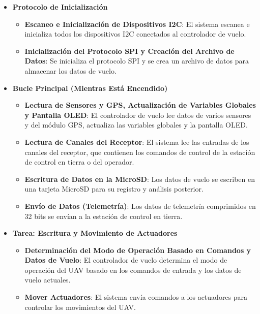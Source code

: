     \begin{itemize}
        \item \textbf{Protocolo de Inicialización}
        \begin{itemize}
            \item \textbf{Escaneo e Inicialización de Dispositivos I2C}: El sistema escanea e inicializa todos los dispositivos I2C conectados al controlador de vuelo.
            \item \textbf{Inicialización del Protocolo SPI y Creación del Archivo de Datos}: Se inicializa el protocolo SPI y se crea un archivo de datos para almacenar los datos de vuelo.
        \end{itemize}
        
        \item \textbf{Bucle Principal (Mientras Está Encendido)}
        \begin{itemize}
            \item \textbf{Lectura de Sensores y GPS, Actualización de Variables Globales y Pantalla OLED}: El controlador de vuelo lee datos de varios sensores y del módulo GPS, actualiza las variables globales y la pantalla OLED.
            \item \textbf{Lectura de Canales del Receptor}: El sistema lee las entradas de los canales del receptor, que contienen los comandos de control de la estación de control en tierra o del operador.
            \item \textbf{Escritura de Datos en la MicroSD}: Los datos de vuelo se escriben en una tarjeta MicroSD para su registro y análisis posterior.
            \item \textbf{Envío de Datos (Telemetría)}: Los datos de telemetría comprimidos en 32 bits se envían a la estación de control en tierra.
        \end{itemize}
       
        \item \textbf{Tarea: Escritura y Movimiento de Actuadores}
        \begin{itemize}
            \item \textbf{Determinación del Modo de Operación Basado en Comandos y Datos de Vuelo}: El controlador de vuelo determina el modo de operación del UAV basado en los comandos de entrada y los datos de vuelo actuales.
            \item \textbf{Mover Actuadores}: El sistema envía comandos a los actuadores para controlar los movimientos del UAV.
        \end{itemize}
    \end{itemize}

